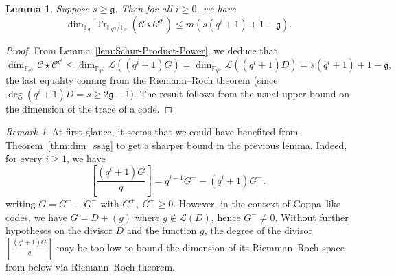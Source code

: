 \documentclass[a4paper]{amsart}
\newtheorem{lemma}[thm]{Lemma}
\theoremstyle{definition}
\theoremstyle{remark}
\newtheorem{remark}[thm]{Remark}
\newcommand{\calL}{\mathcal{L}}
\newcommand{\calC}{\mathcal{C}}
\newcommand{\fqm}{\mathbb{F}_{q^m}}
\newcommand{\fq}{\mathbb{F}_{q}}
\newcommand{\Tr}[1]{\operatorname{Tr}_{\mathbb{F}_{q^m}/\fq}\left(#1\right)}
\begin{document}
\begin{lemma} \label{lem:bound_dim_Tr(C*C^q^i)}
  Suppose $s \geq \mathfrak{g}$. Then for all $i \geq 0$, we have 
   $$\dim_{\fq} \Tr{\calC\star \calC^{q^i}} \leq m\left(s\left(q^i+1\right)+1-\mathfrak{g}\right).$$
\end{lemma}
\begin{proof}
From Lemma~\ref{lem:Schur-Product-Power}, we deduce that 
\[\dim_{\fqm} \calC\star \calC^{q^i} \leq \dim_{\fqm} \calL((q^i+1)G) = \dim_{\fqm} \calL((q^i+1)D) = s(q^i+1)+1-\mathfrak{g},\]
the last equality coming from the Riemann--Roch theorem (since $\deg (q^i+1)D =s \geq 2\mathfrak{g}-1$). The result follows from the usual upper bound on the dimension of the trace of a code. 
\end{proof}

\begin{remark}\label{rmk:improvements}
	At first glance, it seems that we could have benefited from Theorem~\ref{thm:dim_ssag} to get a sharper bound in the previous lemma. Indeed, for every $i \geq 1$, we have 
	\[\left[\frac{(q^i+1)G}{q}\right]=q^{i-1}G^+ - (q^i+1)G^-,\]
	writing $G=G^+-G^-$ with $G^+, \: G^- \geq 0$. However, in the context of Goppa--like codes, we have $G=D+(g)$ where $g \notin \calL(D)$, hence $G^- \neq 0$. Without further hypotheses on the divisor $D$ and the function $g$, the degree of the divisor $\left[\frac{(q^i+1)G}{q}\right]$ may be too low to bound the dimension of its Riemman--Roch space from below via Riemann--Roch theorem.
\end{remark}
\end{document}
